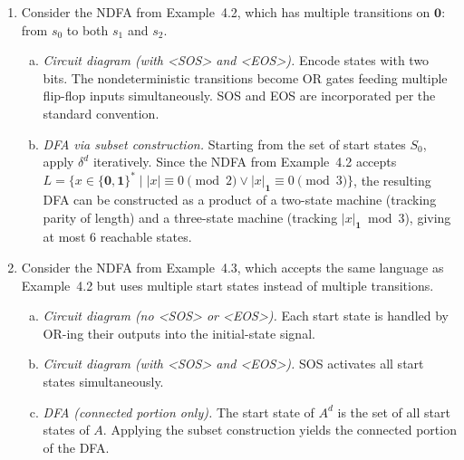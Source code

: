 \begin{enumerate}[{4.}1.]
\begin{enumerate}[(a)]
  \item \emph{DFA including disconnected portion.}
  The full set $\wp(\{s,r,t\})=\{\emptyset,\{s\},\{r\},\{t\},\{s,r\},\{s,t\},\{r,t\},\{s,r,t\}\}$
  yields eight states; most are unreachable from $\{s\}$.  For each
  subset $Q$, $\delta^d(Q,\pmb{a})=\bigcup_{q\in Q}\delta(q,\pmb{a})$ and
  similarly for $\pmb{b}$.  The complete table has 8 rows.

\end{enumerate}

\item Consider the NDFA from Example~4.2, which has multiple transitions on
$\pmb{0}$: from $s_0$ to both $s_1$ and $s_2$.

\begin{enumerate}[(a)]
  \item \emph{Circuit diagram (with \textless SOS\textgreater{} and
    \textless EOS\textgreater).}  Encode states with two bits.  The
    nondeterministic transitions become OR gates feeding multiple
    flip-flop inputs simultaneously.  SOS and EOS are incorporated per
    the standard convention.

  \item \emph{DFA via subset construction.}  Starting from the set of
  start states $S_0$, apply $\delta^d$ iteratively.  Since the NDFA
  from Example~4.2 accepts $L=\{x\in\{\pmb{0},\pmb{1}\}^*\mid
  |x|\equiv 0\pmod{2}\vee|x|_{\pmb{1}}\equiv 0\pmod{3}\}$, the
  resulting DFA can be constructed as a product of a two-state machine
  (tracking parity of length) and a three-state machine (tracking
  $|x|_{\pmb{1}}\bmod 3$), giving at most 6 reachable states.
\end{enumerate}

\item Consider the NDFA from Example~4.3, which accepts the same language as
Example~4.2 but uses multiple start states instead of multiple transitions.

\begin{enumerate}[(a)]
  \item \emph{Circuit diagram (no \textless SOS\textgreater{} or
    \textless EOS\textgreater).}  Each start state is handled by
    OR-ing their outputs into the initial-state signal.

  \item \emph{Circuit diagram (with \textless SOS\textgreater{} and
    \textless EOS\textgreater).}  SOS activates all start states
    simultaneously.

  \item \emph{DFA (connected portion only).}  The start state of $A^d$
  is the set of all start states of $A$.  Applying the subset
  construction yields the connected portion of the DFA.


\end{enumerate}
\end{enumerate}
